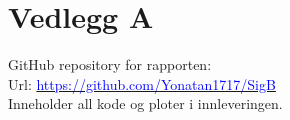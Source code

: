 \hypertarget{Vedlegg A}{}
\section*{Vedlegg A}
\appendix
GitHub repository for rapporten: \\
\indent Url: \href{https://github.com/Yonatan1717/SigB}{\textcolor{blue}{https://github.com/Yonatan1717/SigB}}\\
\indent Inneholder all kode og ploter i innleveringen.
